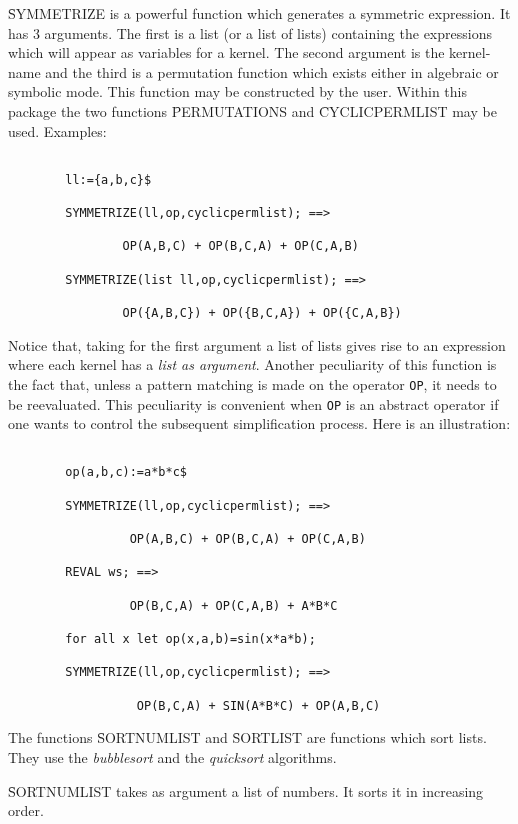 \f{SYMMETRIZE} is a powerful function which generates a symmetric expression.
It has 3 arguments. The first is a list (or a list of lists) containing
the expressions which will appear as variables for a kernel. The second
argument is the kernel-name and the third is a permutation function
which exists either in algebraic or symbolic mode. This
function may be constructed by the user. Within this package
the two functions \f{PERMUTATIONS} and \f{CYCLICPERMLIST} may be used.
Examples:
\begin{verbatim}

        ll:={a,b,c}$

        SYMMETRIZE(ll,op,cyclicpermlist); ==>

                OP(A,B,C) + OP(B,C,A) + OP(C,A,B)

        SYMMETRIZE(list ll,op,cyclicpermlist); ==>

                OP({A,B,C}) + OP({B,C,A}) + OP({C,A,B})

\end{verbatim}
Notice that, taking for the first argument a list of lists gives rise to
an expression where  each kernel has a {\em list as argument}. Another
peculiarity of this function is the fact that, unless a pattern matching is
made on the operator \verb+OP+, it needs to be reevaluated. This peculiarity
is convenient when \verb+OP+ is an abstract operator if one wants to 
control the subsequent simplification process. Here is an illustration:
\begin{verbatim}

        op(a,b,c):=a*b*c$

        SYMMETRIZE(ll,op,cyclicpermlist); ==>

                 OP(A,B,C) + OP(B,C,A) + OP(C,A,B)

        REVAL ws; ==>
                 
                 OP(B,C,A) + OP(C,A,B) + A*B*C

        for all x let op(x,a,b)=sin(x*a*b);

        SYMMETRIZE(ll,op,cyclicpermlist); ==>

                  OP(B,C,A) + SIN(A*B*C) + OP(A,B,C)

\end{verbatim}
The functions \f{SORTNUMLIST} and \f{SORTLIST} are functions which sort
lists. They use the {\em bubblesort} and the {\em quicksort} algorithms.

\f{SORTNUMLIST} takes as argument a list of numbers. It sorts it in
increasing order.

